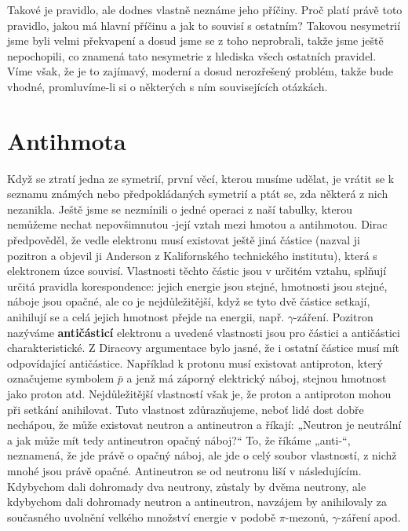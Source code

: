     Takové je pravidlo, ale dodnes vlastně neznáme jeho příčiny. Proč platí právě toto pravidlo,
    jakou má hlavní příčinu a jak to souvisí s ostatním? Takovou nesymetrií jsme byli velmi
    překvapení a dosud jsme se z toho neprobrali, takže jsme ještě nepochopili, co znamená tato
    nesymetrie z hlediska všech ostatních pravidel. Víme však, že je to zajímavý, moderní a dosud
    nerozřešený problém, takže bude vhodné, promluvíme-li si o některých s ním souvisejících
    otázkách.

  \section{Antihmota}\label{fyz:IchapLIIsecVIII}
    Když se ztratí jedna ze symetrií, první věcí, kterou musíme udělat, je vrátit se k seznamu
    známých nebo předpokládaných symetrií a ptát se, zda některá z nich nezanikla. Ještě jsme se
    nezmínili o jedné operaci z naší tabulky, kterou nemůžeme nechat nepovšimnutou -její vztah mezi
    hmotou a antihmotou. Dirac předpověděl, že vedle elektronu musí existovat ještě jiná částice
    (nazval ji pozitron a objevil ji Anderson z Kalifornského technického institutu), která s
    elektronem úzce souvisí. Vlastnosti těchto částic jsou v určitém vztahu, splňují určitá pravidla
    korespondence: jejich energie jsou stejné, hmotnosti jsou stejné, náboje jsou opačné, ale co je
    nejdůležitější, když se tyto dvě částice setkají, anihilují se a celá jejich hmotnost přejde na
    energii, např. \(\gamma\)-záření. Pozitron nazýváme \textbf{antičásticí} elektronu a uvedené
    vlastnosti jsou pro částici a antičástici charakteristické. Z Diracovy argumentace bylo jasné,
    že i ostatní částice musí mít odpovídající antičástice. Například k protonu musí existovat
    antiproton, který označujeme symbolem \(\bar{p}\) a jenž má záporný elektrický náboj, stejnou
    hmotnost jako proton atd. Nejdůležitější vlastností však je, že proton a antiproton mohou při
    setkání anihilovat. Tuto vlastnost zdůrazňujeme, neboť lidé dost dobře nechápou, že může
    existovat neutron a antineutron a říkají: „Neutron je neutrální a jak může mít tedy antineutron
    opačný náboj?“ To, že říkáme „anti-“, neznamená, že jde právě o opačný náboj, ale jde o celý
    soubor vlastností, z nichž mnohé jsou právě opačné. Antineutron se od neutronu liší v
    následujícím. Kdybychom dali dohromady dva neutrony, zůstaly by dvěma neutrony, ale kdybychom
    dali dohromady neutron a antineutron, navzájem by anihilovaly za současného uvolnění velkého
    množství energie v podobě \(\pi\)-mezonů, \(\gamma\)-záření apod.

